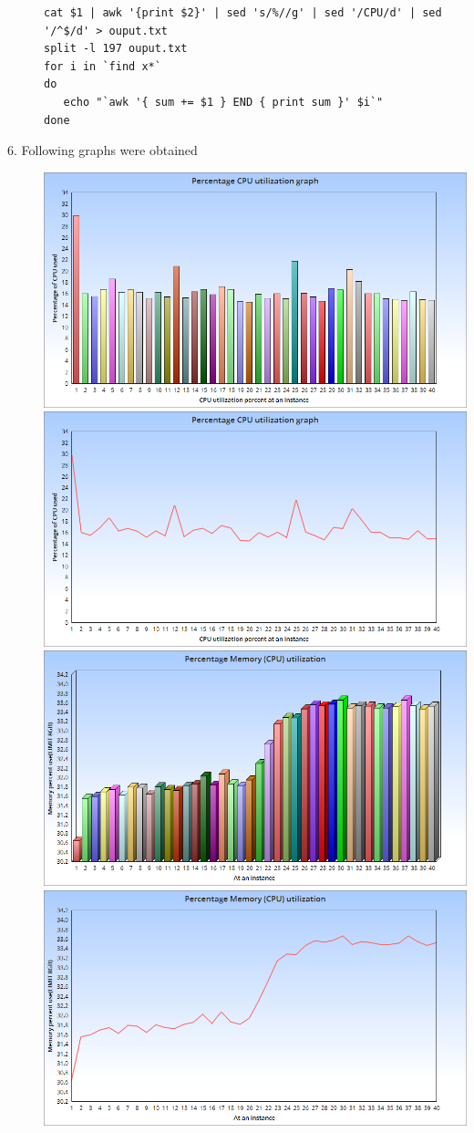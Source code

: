 \documentclass[11pt]{article}
\begin{document}
\begin{description}
\begin{verbatim}
cat $1 | awk '{print $2}' | sed 's/%//g' | sed '/CPU/d' | sed '/^$/d' > ouput.txt
split -l 197 ouput.txt
for i in `find x*`
do
   echo "`awk '{ sum += $1 } END { print sum }' $i`"
done
\end{verbatim}
\item[{6. Following graphs were obtained}] \includegraphics[width=.9\linewidth]{./images/CPU-utilization-bar-graph.png}
   \includegraphics[width=.9\linewidth]{./images/CPU-utilizaton-line-graph.png}
   \includegraphics[width=.9\linewidth]{./images/memory-utilization-bar-graph.png}
   \includegraphics[width=.9\linewidth]{./images/memory-utilization-line-graph.png}
\end{description}
\end{document}
